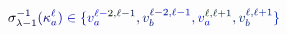 \documentclass[12pt]{article}
\begin{document}
\makeatletter
\renewcommand*{\@textcolor}[3]{%
  \protect\leavevmode
  \begingroup
    \color#1{#2}#3%
  \endgroup
}
\makeatother
\begin{displaymath}
\mathcolor[RGB]{0,0,15}{\sigma} _ { \mathcolor[RGB]{0,0,30}{\lambda} \mathcolor[RGB]{0,0,45}{-} \mathcolor[RGB]{0,0,60}{1} } ^ { \mathcolor[RGB]{0,0,75}{-} \mathcolor[RGB]{0,0,90}{1} } \mathcolor[RGB]{0,0,105}{(} \mathcolor[RGB]{0,0,120}{\kappa} _ { \mathcolor[RGB]{0,0,135}{a} } ^ { \mathcolor[RGB]{0,0,150}{\ell} } \mathcolor[RGB]{0,0,165}{)} \mathcolor[RGB]{0,0,180}{\in} \mathcolor[RGB]{0,0,195}{\{} \mathcolor[RGB]{0,0,210}{v} _ { \mathcolor[RGB]{0,0,225}{a} } ^ { \mathcolor[RGB]{0,0,240}{\ell} \mathcolor[RGB]{0,0,255}{-} \mathcolor[RGB]{0,15,0}{2} \mathcolor[RGB]{0,15,15}{,} \mathcolor[RGB]{0,15,30}{\ell} \mathcolor[RGB]{0,15,45}{-} \mathcolor[RGB]{0,15,60}{1} } \mathcolor[RGB]{0,15,75}{,} \mathcolor[RGB]{0,15,90}{v} _ { \mathcolor[RGB]{0,15,105}{b} } ^ { \mathcolor[RGB]{0,15,120}{\ell} \mathcolor[RGB]{0,15,135}{-} \mathcolor[RGB]{0,15,150}{2} \mathcolor[RGB]{0,15,165}{,} \mathcolor[RGB]{0,15,180}{\ell} \mathcolor[RGB]{0,15,195}{-} \mathcolor[RGB]{0,15,210}{1} } \mathcolor[RGB]{0,15,225}{,} \mathcolor[RGB]{0,15,240}{v} _ { \mathcolor[RGB]{0,15,255}{a} } ^ { \mathcolor[RGB]{0,30,0}{\ell} \mathcolor[RGB]{0,30,15}{,} \mathcolor[RGB]{0,30,30}{\ell} \mathcolor[RGB]{0,30,45}{+} \mathcolor[RGB]{0,30,60}{1} } \mathcolor[RGB]{0,30,75}{,} \mathcolor[RGB]{0,30,90}{v} _ { \mathcolor[RGB]{0,30,105}{b} } ^ { \mathcolor[RGB]{0,30,120}{\ell} \mathcolor[RGB]{0,30,135}{,} \mathcolor[RGB]{0,30,150}{\ell} \mathcolor[RGB]{0,30,165}{+} \mathcolor[RGB]{0,30,180}{1} } \mathcolor[RGB]{0,30,195}{\}}
\end{displaymath}
\end{document}
